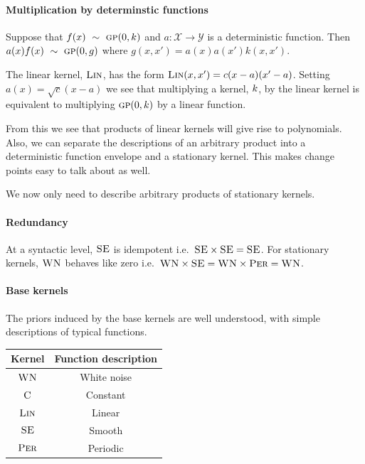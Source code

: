 \documentclass{article}
\def\ie{i.e.\ }
\begin{document}
\paragraph{Multiplication by determinstic functions}

Suppose that $f(x) \ \sim\  {\textsc{gp}}{}(0, k)$ and $a : \mathcal{X} \to \mathcal{Y}$ is a deterministic function.
Then $a(x)f(x) \ \sim\  {\textsc{gp}}{}(0, g)$ where $g(x, x') = a(x)a(x')k(x, x')$.

The linear kernel, ${\textsc{Lin}}$, has the form ${\textsc{Lin}}(x, x') = c(x-a)(x'-a)$.
Setting $a(x) = \sqrt{c}(x-a)$ we see that multiplying a kernel, $k$, by the linear kernel is equivalent to multiplying ${\textsc{gp}}{}(0, k)$ by a linear function.

From this we see that products of linear kernels will give rise to polynomials.
Also, we can separate the descriptions of an arbitrary product into a deterministic function envelope and a stationary kernel.
This makes change points easy to talk about as well.

We now only need to describe arbitrary products of stationary kernels.

\paragraph{Redundancy}

At a syntactic level, ${\textsc{SE}}$ is idempotent \ie ${\textsc{SE}} \times {\textsc{SE}} = {\textsc{SE}}$.
For stationary kernels, ${\textsc{WN}}$ behaves like zero \ie ${\textsc{WN}} \times {\textsc{SE}} = {\textsc{WN}} \times {\textsc{Per}} =  {\textsc{WN}}$.

\paragraph{Base kernels}

The priors induced by the base kernels are well understood, with simple descriptions of typical functions.

\begin{table}[ht]
\centering
\begin{tabular}{c|c}
Kernel & Function description \\
\midrule
${\textsc{WN}}$ & White noise \\
${\textsc{C}}$ & Constant \\
${\textsc{Lin}}$ & Linear \\
${\textsc{SE}}$ & Smooth \\
${\textsc{Per}}$ & Periodic \\
\end{tabular}
\label{table:base-kernels}
\end{table}
\end{document}
